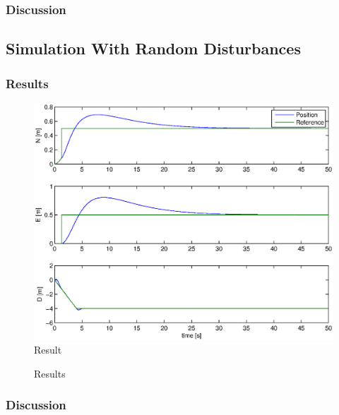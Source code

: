 \subsubsection{Discussion}
\subsection{Simulation With Random Disturbances}
\subsubsection{Results}
\begin{figure}[H]
\centering
\includegraphics[width = 17cm]{fig/plots/simulation/positionNoDisturbance.eps}
\caption{Result}
\end{figure}
\begin{figure}[H]
\centering
{}
\centering
{}
\caption{Results}
\end{figure}
\subsubsection{Discussion}